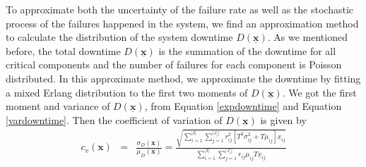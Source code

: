 \documentclass[preprint,12pt]{elsarticle}
\begin{document}
To approximate both the uncertainty of the failure rate as well as the stochastic process of the failures happened in the system, we find an approximation method to calculate the distribution of the system downtime $D(\underline{\boldsymbol{x}})$. As we mentioned before, the total downtime $D(\underline{\boldsymbol{x}})$ is the summation of the downtime for all critical components and the number of failures for each component is Poisson distributed. In this approximate method, we approximate the downtime by fitting a mixed Erlang distribution to the first two moments of $D(\underline{\boldsymbol{x}})$. We got the first moment and variance of $D(\underline{\boldsymbol{x}})$, from Equation \eqref{expdowntime} and Equation \eqref{vardowntime}. Then the coefficient of variation of $D(\underline{\boldsymbol{x}})$ is given by
\small
\begin{eqnarray}
c_{v}(\boldsymbol{x}) &=& \frac{\sigma_{D}(\boldsymbol{x})}{\mu_{D}(\boldsymbol{x})} = \frac{\sqrt{\sum_{i=1}^{\lvert I \rvert}\sum_{j=1}^{\lvert J_{i} \rvert}r_{ij}^{2}[T^{2}\sigma^{2}_{ij}+T\mu_{ij}]\underline{x}_{ij}}}{\sum^{\lvert I \rvert}_{i=1} \sum_{j=1}^{\lvert J_{i} \rvert}{r_{ij}\mu_{ij}T\underline{x}_{ij}}} \label{cv}
\end{eqnarray}
\end{document}
